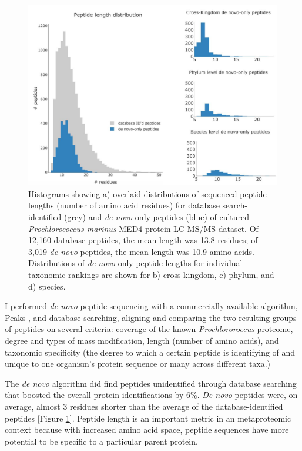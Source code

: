 \documentclass[12pt, letterpaper, twoside]{article}
\begin{document}
\begin{figure}
	\includegraphics[width=\linewidth]{fig1-denovo.jpg}
	\caption{Histograms showing a) overlaid distributions of sequenced peptide lengths (number of amino acid residues) for database search-identified (grey) and \textit{de novo}-only peptides (blue) of cultured \textit{Prochlorococcus marinus} MED4 protein LC-MS/MS dataset. Of 12,160 database peptides, the mean length was 13.8 residues; of 3,019 \textit{de novo} peptides, the mean length was 10.9 amino acids. Distributions of \textit{de novo}-only peptide lengths for individual taxonomic rankings are shown for b) cross-kingdom, c) phylum, and d) species.}
	\label{fig:de-novo-hists}
\end{figure}

I performed \textit{de novo} peptide sequencing with a commercially available algorithm, Peaks \cite{ma_peaks:_2003}, and database searching, aligning and comparing the two resulting groups of peptides on several criteria: coverage of the known \textit{Prochlororoccus} proteome, degree and types of mass modification, length (number of amino acids), and taxonomic specificity (the degree to which a certain peptide is identifying of and unique to one organism's protein sequence or many across different taxa.)

The \textit{de novo} algorithm did find peptides unidentified through database searching that boosted the overall protein identifications by 6\%. \textit{De novo} peptides were, on average, almost 3 residues shorter than the average of the database-identified peptides [Figure \ref{fig:de-novo-hists}]. Peptide length is an important metric in an metaproteomic context because with increased amino acid space, peptide sequences have more potential to be specific to a particular parent protein. 
\end{document}
